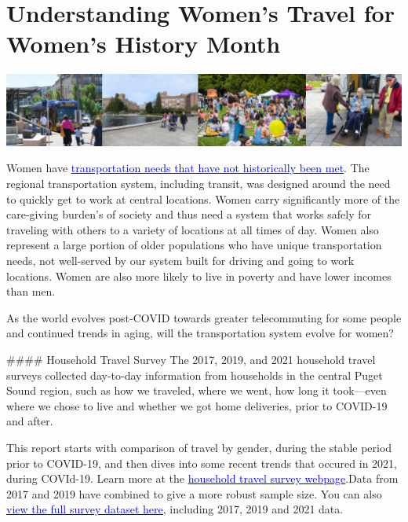\documentclass[
  12pt,
]{article}
\begin{document}
\hypertarget{understanding-womens-travel-for-womens-history-month}{%
\section{Understanding Women's Travel for Women's History
Month}\label{understanding-womens-travel-for-womens-history-month}}

\includegraphics[width=1\textwidth,height=\textheight]{women_image_header.png}

\begin{flushleft}
Women have \href{http://libraryarchives.metro.net/DB_Attachments/2019-0294/UnderstandingHowWomenTravel_FullReport_FINAL.pdf}{\underline{\textcolor{blue}{transportation needs that have not historically been met}}}. The regional transportation system, including transit, was designed around the need to quickly get to work at central locations. Women carry significantly more of the care-giving burden's of society and thus need a system that works safely for traveling with others to a variety of locations at all times of day. Women also represent a large portion of older populations who have unique transportation needs, not well-served by our system built for driving and going to work locations. Women are also more likely to live in poverty and have lower incomes than men.

As the world evolves post-COVID towards greater telecommuting for some people and continued trends in aging, will the transportation system evolve for women?

\begin{flushleft}
#### Household Travel Survey
The 2017, 2019, and 2021 household travel surveys collected day-to-day information from households in the central Puget Sound region, such as how we traveled, where we went, how long it took—even where we chose to live and whether we got home deliveries, prior to COVID-19 and after.

This report starts with comparison of travel by gender, during the stable period prior to COVID-19, and then dives into some recent trends that occured in 2021, during COVId-19.  Learn more at the \href{https://www.psrc.org/our-work/household-travel-survey-program}{\underline{\textcolor{blue}{household travel survey webpage}}}.Data from 2017 and 2019 have combined to give a more robust sample size.  You can also \href{https://household-travel-survey-psregcncl.hub.arcgis.com}{\underline{\textcolor{blue}{view the full survey dataset here}}}, including 2017, 2019 and 2021 data. 



\end{flushleft}
\end{flushleft}
\end{document}
